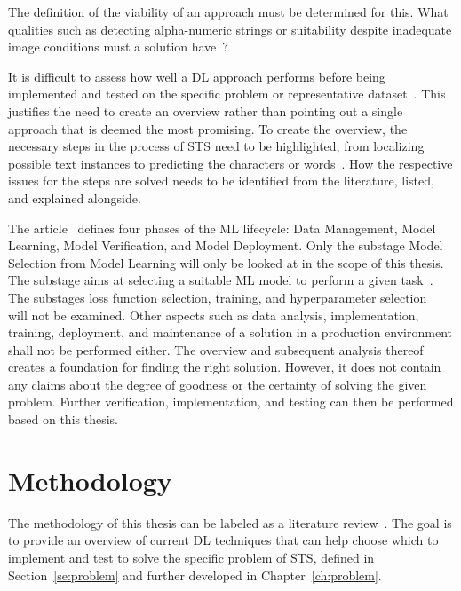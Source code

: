 The definition of the viability of an approach must be determined for this.
What qualities such as detecting alpha-numeric strings or suitability despite
inadequate image conditions must a solution have~\citep{ghosh_visual_2017, hu_gtc_2020}?

It is difficult to assess how well a \ac{DL} approach performs before being
implemented and tested on the specific problem or representative dataset~\citep{arpteg_software_2018}.
This justifies the need to create an overview rather than pointing out a single approach that is
deemed the most promising.
To create the overview, the necessary steps in the process of \ac{STS} need to be highlighted,
from localizing possible text instances to predicting the characters or
words~\citep{long_scene_2021, sourvanos_challenges_2018}.
How the respective issues for the steps are solved needs to be
identified from the literature, listed, and explained alongside.

The article~\cite{ashmore_assuring_2021} defines four phases of the \ac{ML} lifecycle:
Data Management, Model Learning, Model Verification, and Model Deployment.
Only the substage Model Selection from Model Learning will only be looked at in the scope of this
thesis.
The substage aims at selecting a suitable \ac{ML} model to perform a given
task~\citep{ashmore_assuring_2021}.
The substages loss function selection, training, and hyperparameter
selection~\citep{ashmore_assuring_2021} will not be examined.
Other aspects such as data analysis, implementation, training, deployment, and maintenance of a
solution in a production environment shall not be performed either.
The overview and subsequent analysis thereof creates a foundation for finding the right solution.
However, it does not contain any claims about the degree of goodness or the certainty of
solving the given problem.
Further verification, implementation, and testing can then be performed based on this thesis.

\section{Methodology}\label{se:methodology}
The methodology of this thesis can be labeled as a literature review~\citep{snyder_literature_2019,
torraco_writing_2005}.
The goal is to provide an overview of current \ac{DL} techniques that can help choose
which to implement and test to solve the specific problem of \ac{STS}, defined in
Section~\ref{se:problem} and further developed in Chapter~\ref{ch:problem}.

